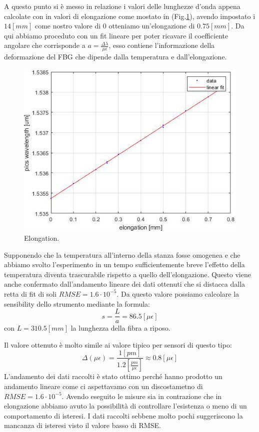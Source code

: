 A questo punto si è messo in relazione i valori delle lunghezze d'onda appena calcolate con in valori di elongazione come mostato in (Fig.\ref{fig:spins}), avendo impostato i $14[mm]$ come nostro valore di 0 otteniamo un'elongazione di $0.75[mm]$. Da qui abbiamo proceduto con un fit lineare per poter ricavare il coefficiente angolare che corrisponde a $a = \frac{\Delta \lambda}{\mu \epsilon}$, esso contiene l'informazione della deformazione del FBG che dipende dalla temperatura e dall'elongazione.
\begin{figure}[h]
    \centering
    \includegraphics[scale=0.7]{img/spins.jpg}
    \caption{Elongation.}
    \label{fig:spins}
\end{figure}
 Supponendo che la temperatura all'interno della stanza fosse omogenea e che abbiamo svolto l'esperimento in un tempo sufficientemente breve l'effetto della temperatura diventa trascurabile rispetto a quello dell'elongazione. Questo viene anche confermato dall'andamento lineare dei dati ottenuti che si distacca dalla retta di fit di soli $RMSE = 1.6 \cdot 10^{-5}$. Da questo valore possiamo calcolare la sensibility dello strumento mediante la formula:
$$s = \frac{L}{a} = 86.5[\mu \epsilon]$$
con $L=310.5[mm]$ la lunghezza della fibra a riposo.


\newpage
{}
Il valore ottenuto è molto simile ai valore tipico per sensori di questo tipo:
$$\Delta(\mu\epsilon) = \frac{1 [pm]}{ 1.2 [\frac{pm}{\mu\epsilon}]} \approx 0.8 [\mu \epsilon]$$
L'andamento dei dati raccolti è stato ottimo perché hanno prodotto un andamento lineare come ci aspettavamo con un discostametno di $RMSE = 1.6 \cdot 10^{-5}$. Avendo eseguito le misure sia in contrazione che in elongazione abbiamo avuto la possibilità di controllare l'esistenza o meno di un comportamento di isteresi. I dati raccolti sebbene molto pochi suggeriscono la mancanza di isteresi visto il valore basso di RMSE.
